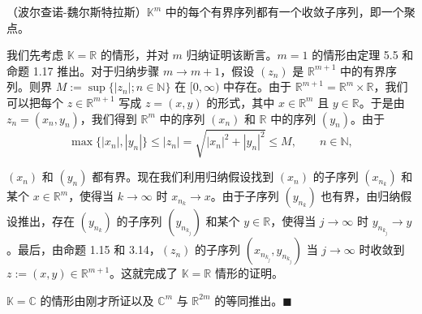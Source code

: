 \begin{theorem}

（波尔查诺-魏尔斯特拉斯）$ \mathbb{K}^m $ 中的每个有界序列都有一个收敛子序列，即一个聚点。

\proofhead
我们先考虑 $ \mathbb{K} = \mathbb{R} $ 的情形，并对 $ m $ 归纳证明该断言。$ m = 1 $ 的情形由定理 5.5 和命题 1.17 推出。对于归纳步骤 $ m \to m + 1 $，假设 $ (z_n) $ 是 $ \mathbb{R}^{m+1} $ 中的有界序列。则界 $ M := \sup\{|z_n|; n \in \mathbb{N}\} $ 在 $ [0, \infty) $ 中存在。由于 $ \mathbb{R}^{m+1} = \mathbb{R}^m \times \mathbb{R} $，我们可以把每个 $ z \in \mathbb{R}^{m+1} $ 写成 $ z = (x, y) $ 的形式，其中 $ x \in \mathbb{R}^m $ 且 $ y \in \mathbb{R} $。于是由 $ z_n = (x_n, y_n) $，我们得到 $ \mathbb{R}^m $ 中的序列 $ (x_n) $ 和 $ \mathbb{R} $ 中的序列 $ (y_n) $。由于
\[
\max\{|x_{n}|,|y_{n}|\}\leq|z_{n}|=\sqrt{|x_{n}|^{2}+|y_{n}|^{2}}\leq M,\qquad n\in\mathbb{N},
\]

$(x_n)$ 和 $(y_n)$ 都有界。现在我们利用归纳假设找到 $(x_n)$ 的子序列 $(x_{n_k})$ 和某个 $x \in \mathbb{R}^m$，使得当 $k \to \infty$ 时 $x_{n_k} \to x$。由于子序列 $(y_{n_k})$ 也有界，由归纳假设推出，存在 $(y_{n_k})$ 的子序列 $(y_{n_{k_j}})$ 和某个 $y \in \mathbb{R}$，使得当 $j \to \infty$ 时 $y_{n_{k_j}} \to y$。最后，由命题 1.15 和 3.14，$(z_n)$ 的子序列 $(x_{n_{k_j}}, y_{n_{k_j}})$ 当 $j \to \infty$ 时收敛到 $z := (x, y) \in \mathbb{R}^{m+1}$。这就完成了 $\mathbb{K} = \mathbb{R}$ 情形的证明。

$ \mathbb{K} = \mathbb{C} $ 的情形由刚才所证以及 $ \mathbb{C}^m $ 与 $ \mathbb{R}^{2m} $ 的等同推出。$ \blacksquare $

\end{theorem}

\exerciseshead

